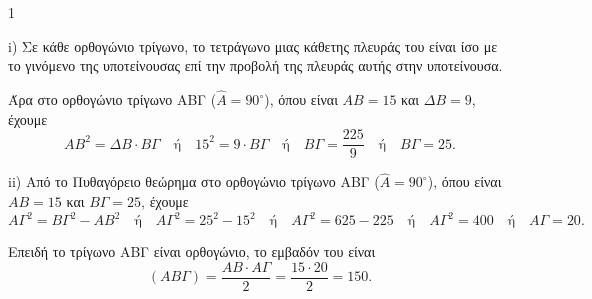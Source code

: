 \begin{ylh}{1}
	\begin{alist}
		\item[α)]
		\begin{rlist}
			\item i) Σε κάθε ορθογώνιο τρίγωνο, το τετράγωνο μιας κάθετης πλευράς του είναι ίσο με το γινόμενο της υποτείνουσας επί την προβολή της πλευράς αυτής στην υποτείνουσα.

			Άρα στο ορθογώνιο τρίγωνο ΑΒΓ ($\hat{A} = 90^\circ$), όπου είναι $ΑΒ = 15$ και $ΔΒ = 9$, έχουμε
			\[
				ΑΒ^2 = ΔΒ \cdot ΒΓ \quad \text{ή} \quad 15^2 = 9 \cdot ΒΓ \quad \text{ή} \quad ΒΓ = \frac{225}{9} \quad \text{ή} \quad ΒΓ = 25.
			\]
			\item ii) Από το Πυθαγόρειο θεώρημα στο ορθογώνιο τρίγωνο ΑΒΓ ($\hat{A} = 90^\circ$), όπου είναι $ΑΒ = 15$ και $ΒΓ = 25$, έχουμε
			\[
				ΑΓ^2 = ΒΓ^2 - ΑΒ^2 \quad \text{ή} \quad ΑΓ^2 = 25^2 - 15^2 \quad \text{ή} \quad ΑΓ^2 = 625 - 225 \quad \text{ή} \quad ΑΓ^2 = 400 \quad \text{ή} \quad ΑΓ = 20.
			\]
		\end{rlist}
		\item[β)] Επειδή το τρίγωνο ΑΒΓ είναι ορθογώνιο, το εμβαδόν του είναι
		\[
			(ΑΒΓ) = \frac{ΑΒ \cdot ΑΓ}{2} = \frac{15 \cdot 20}{2} = 150.
		\]
	\end{alist}
\end{ylh}